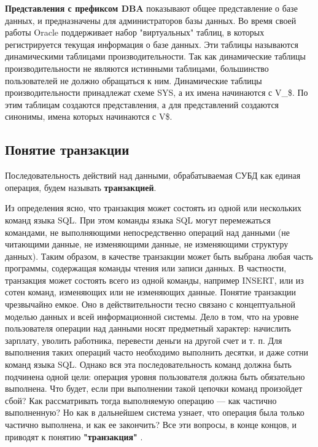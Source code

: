 \textbf{Представления с префиксом DBA} показывают общее представление о базе
данных, и предназначены для администраторов базы данных.
Во время своей работы Oracle поддерживает набор "виртуальных" таблиц,
в которых регистрируется текущая информация о базе данных. Эти таблицы
называются динамическими таблицами производительности. Так как динамические таблицы производительности не являются истинными таблицами,
большинство пользователей не должно обращаться к ним. Динамические
таблицы производительности принадлежат схеме SYS, а их имена начинаются
с V\_\$. По этим таблицам создаются представления, а для представлений создаются синонимы, имена которых начинаются с V\$.

\subsection{Понятие транзакции}
\begin{grayquote}
Последовательность действий над данными, обрабатываемая СУБД как единая
операция, будем называть \textbf{транзакцией}.
\end{grayquote}
Из определения ясно, что транзакция может состоять из одной или нескольких команд языка SQL. При этом команды языка SQL могут перемежаться
командами, не выполняющими непосредственно операций над данными (не
читающими данные, не изменяющими данные, не изменяющими структуру
данных). Таким образом, в качестве транзакции может быть выбрана любая
часть программы, содержащая команды чтения или записи данных. В частности, транзакция может состоять всего из одной команды, например INSERT,
или из сотен команд, изменяющих или не изменяющих данные.
Понятие транзакции чрезвычайно емкое. Оно в действительности тесно связано с концептуальной моделью данных и всей информационной системы.
Дело в том, что на уровне пользователя операции над данными носят предметный характер: начислить зарплату, уволить работника, перевести деньги
на другой счет и т. п. Для выполнения таких операций часто необходимо выполнить десятки, и даже сотни команд языка SQL. Однако вся эта последовательность команд должна быть подчинена одной цели: операция уровня
пользователя должна быть обязательно выполнена. Что будет, если при выполнении такой цепочки команд произойдет сбой? Как рассматривать тогда
выполняемую операцию — как частично выполненную? Но как в дальнейшем система узнает, что операция была только частично выполнена, и как ее
закончить? Все эти вопросы, в конце концов, и приводят к понятию \textbf{"транзакция"} \autocite{Pirogov2009}.

